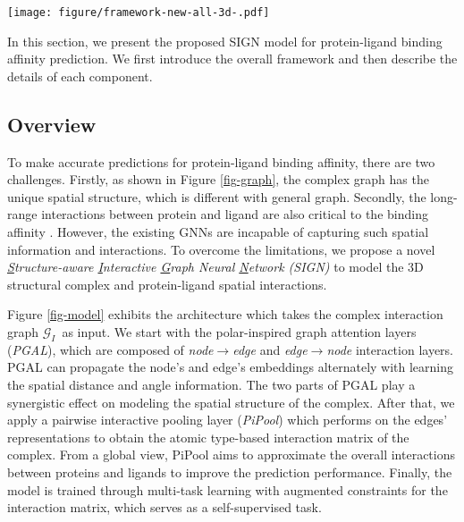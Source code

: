 \documentclass[sigconf]{acmart}
\newcommand{\model}{\textsf{SIGN}\xspace}
\newcommand{\gnn}{PGAL\xspace}
\newcommand{\pool}{PiPool\xspace}
\newcommand{\graph}{\ensuremath{\mathcal{G}_I}}
\newcommand{\dta}{protein-ligand binding affinity}
\begin{document}
\begin{figure*}[t]
\centering
\texttt{[image: figure/framework-new-all-3d-.pdf]}
\vspace{-7mm}
\caption{Illustration of the proposed \model framework. 
(a), (b): The two key components \gnn and \pool. (c), (d): The two inner structures of component \gnn. (e), (f): The aggregation processes in \textit{node$\rightarrow$edge} and \textit{edge$\rightarrow$node} interaction layers.
}
\label{fig-model}
\vspace{-4mm}
\end{figure*}


In this section, we present the proposed \model{} model for protein-ligand binding affinity prediction. We first introduce the overall framework and then describe the details of each component.

\subsection{Overview}
To make accurate predictions for \dta, there are two challenges. Firstly, as shown in Figure \ref{fig-graph}, the complex graph has the unique spatial structure, which is different with general graph. Secondly, the long-range interactions between  protein and ligand are also critical to the binding affinity \cite{leckband1992long}. However, the existing GNNs are incapable of capturing such spatial information and interactions. To overcome the limitations, we propose a novel \textit{\underline{S}tructure-aware \underline{I}nteractive \underline{G}raph Neural \underline{N}etwork (\model)} to model the 3D structural complex and protein-ligand spatial interactions. 

Figure \ref{fig-model} exhibits the architecture which takes the complex interaction graph \graph \ as input. We start with the polar-inspired graph attention layers (\textit{\gnn}), which are composed of \textit{node$\rightarrow$edge} and \textit{edge$\rightarrow$node} interaction layers. \gnn can propagate the node's and edge's embeddings alternately with learning the spatial distance and angle information. The two parts of \gnn play a synergistic effect on modeling the spatial structure of the complex. After that, we apply a pairwise interactive pooling layer (\textit{\pool}) which performs on the edges' representations to obtain the atomic type-based interaction matrix of the complex. From a global view, \pool aims to approximate the overall interactions between proteins and ligands to improve the prediction performance. Finally, the model is trained through multi-task learning with augmented constraints for the interaction matrix, which serves as a self-supervised task.
\end{document}
